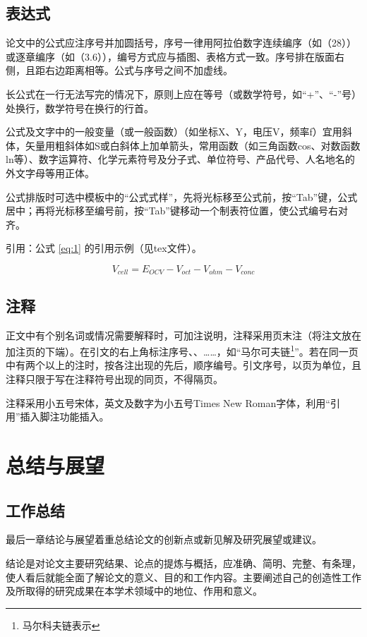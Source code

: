 \documentclass{seuthesis-2022}
\begin{document}
\section{表达式}
论文中的公式应注序号并加圆括号，序号一律用阿拉伯数字连续编序（如（28））或逐章编序（如（3.6）），编号方式应与插图、表格方式一致。序号排在版面右侧，且距右边距离相等。公式与序号之间不加虚线。

长公式在一行无法写完的情况下，原则上应在等号（或数学符号，如“+”、“-”号）处换行，数学符号在换行的行首。

公式及文字中的一般变量（或一般函数）（如坐标X、Y，电压V，频率f）宜用斜体，矢量用粗斜体如S或白斜体上加单箭头，常用函数（如三角函数cos、对数函数ln等）、数字运算符、化学元素符号及分子式、单位符号、产品代号、人名地名的外文字母等用正体。

公式排版时可选中模板中的“公式式样”，先将光标移至公式前，按“Tab”键，公式居中；再将光标移至编号前，按“Tab”键移动一个制表符位置，使公式编号右对齐。

引用：公式 \eqref{eq:1} 的引用示例（见tex文件）。

\begin{equation}\label{eq:1}
V_{cell}=E_{OCV}-V_{oct}-V_{ohm}-V_{conc}
\end{equation}
  
\section{注释}
正文中有个别名词或情况需要解释时，可加注说明，注释采用页末注（将注文放在加注页的下端）。在引文的右上角标注序号、、……，如“马尔可夫链\footnote{马尔科夫链表示}”。若在同一页中有两个以上的注时，按各注出现的先后，顺序编号。引文序号，以页为单位，且注释只限于写在注释符号出现的同页，不得隔页。

注释采用小五号宋体，英文及数字为小五号Times New Roman字体，利用“引用”插入脚注功能插入。

\chapter{总结与展望}
\section{工作总结}
最后一章结论与展望着重总结论文的创新点或新见解及研究展望或建议。

结论是对论文主要研究结果、论点的提炼与概括，应准确、简明、完整、有条理，使人看后就能全面了解论文的意义、目的和工作内容。主要阐述自己的创造性工作及所取得的研究成果在本学术领域中的地位、作用和意义。
\end{document}
